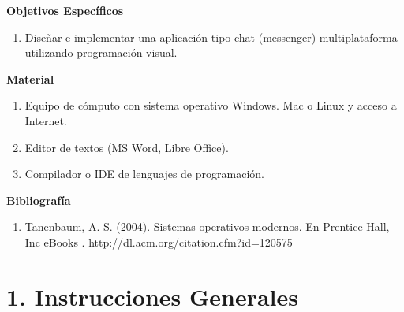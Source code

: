 \documentclass[12pt]{article}
\begin{document}
\begin{tcolorbox}
    \begin{center}
        \textbf{Objetivos Específicos}
    \end{center}
    \begin{enumerate}
        \item Diseñar e implementar una aplicación tipo chat (messenger) multiplataforma utilizando programación visual.
    \end{enumerate}
    \vspace{0.1cm}
\end{tcolorbox}

\begin{tcolorbox}
    \begin{center}
        \textbf{Material}
    \end{center}
    \begin{enumerate}
        \item Equipo de cómputo con sistema operativo Windows. Mac o Linux y acceso a Internet.
        \item Editor de textos (MS Word, Libre Office).
        \item Compilador o IDE de lenguajes de programación.
    \end{enumerate}
    \vspace{0.1cm}
\end{tcolorbox}

\begin{tcolorbox}
    \begin{center}
        \textbf{Bibliografía}
    \end{center}
    \begin{enumerate}
        \item Tanenbaum, A. S. (2004). Sistemas operativos modernos. En Prentice-Hall, Inc eBooks . http://dl.acm.org/citation.cfm?id=120575
    \end{enumerate}
    \vspace{0.1cm}
\end{tcolorbox}

\newpage %
\pagestyle{fancy}

\section{\large 1. Instrucciones Generales}
\end{document}
